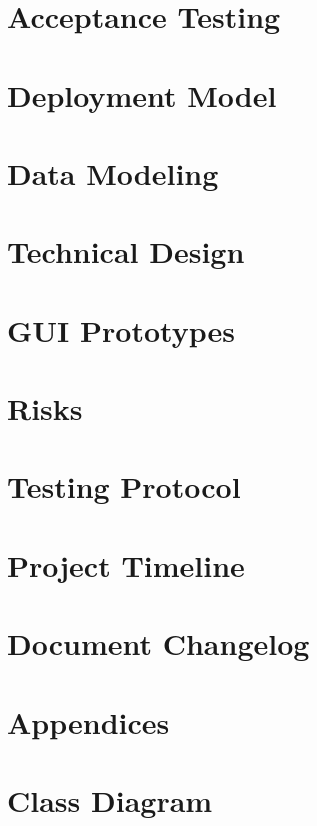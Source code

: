\documentclass{article}
\begin{document}
	\section{Acceptance Testing}
	
	
	\section{Deployment Model}
	
	
	\section{Data Modeling}
	
	
	\section{Technical Design}
	
	
	\section{GUI Prototypes}
	
	
	\section{Risks}
	
	
	\section{Testing Protocol}
	
	
	\section{Project Timeline}
	
	
	\section{Document Changelog}
	
	
	\appendix
	\section*{Appendices}
	\section{Class Diagram}
\end{document}
